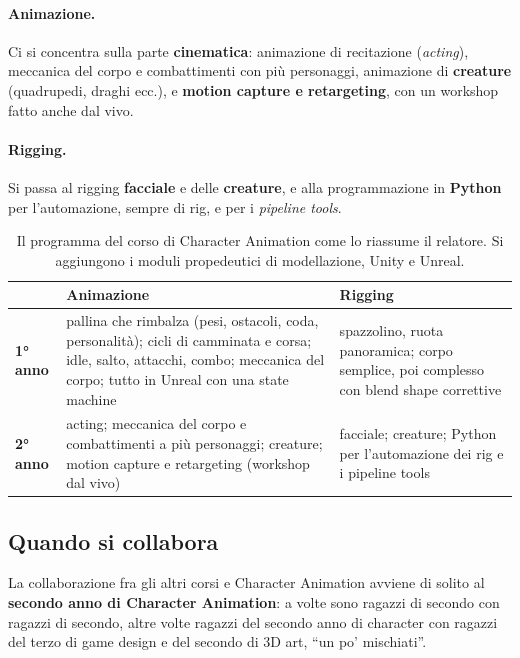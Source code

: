 \paragraph{Animazione.} Ci si concentra sulla parte \textbf{cinematica}:
animazione di recitazione (\emph{acting}), meccanica del corpo e combattimenti
con più personaggi, animazione di \textbf{creature} (quadrupedi, draghi
ecc.), e \textbf{motion capture e retargeting}, con un workshop fatto anche
dal vivo.

\paragraph{Rigging.} Si passa al rigging \textbf{facciale} e delle
\textbf{creature}, e alla programmazione in \textbf{Python} per
l'automazione, sempre di rig, e per i \emph{pipeline tools}.

\begin{table}[htbp]
\centering
\small
\begin{tabular}{@{}lp{5.2cm}p{5.2cm}@{}}
\toprule
 & \textbf{Animazione} & \textbf{Rigging} \\
\midrule
\textbf{1° anno} & pallina che rimbalza (pesi, ostacoli, coda,
personalità); cicli di camminata e corsa; idle, salto, attacchi, combo;
meccanica del corpo; tutto in Unreal con una state machine &
spazzolino, ruota panoramica; corpo semplice, poi complesso con blend shape
correttive \\
\addlinespace
\textbf{2° anno} & acting; meccanica del corpo e combattimenti a più
personaggi; creature; motion capture e retargeting (workshop dal vivo) &
facciale; creature; Python per l'automazione dei rig e i pipeline tools \\
\bottomrule
\end{tabular}
\caption{Il programma del corso di Character Animation come lo riassume il
relatore. Si aggiungono i moduli propedeutici di modellazione, Unity e
Unreal.}
\label{p4:tab:programma}
\end{table}

\subsection{Quando si collabora}

La collaborazione fra gli altri corsi e Character Animation avviene di solito
al \textbf{secondo anno di Character Animation}: a volte sono ragazzi di
secondo con ragazzi di secondo, altre volte ragazzi del secondo anno di
character con ragazzi del terzo di game design e del secondo di 3D art, ``un
po' mischiati''.

